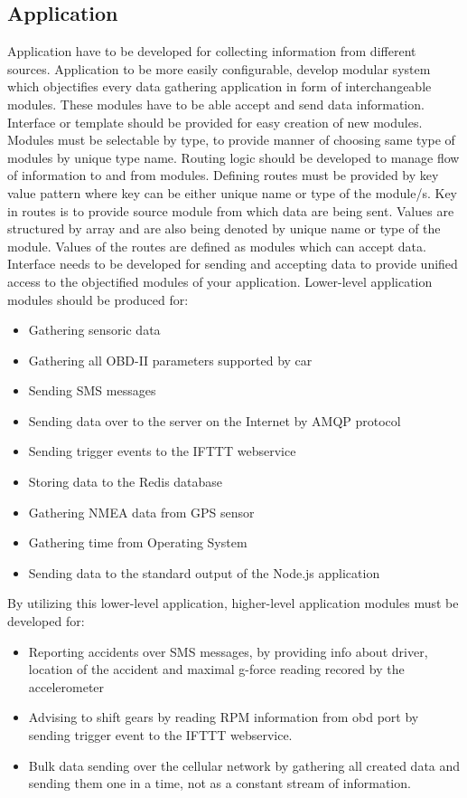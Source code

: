 \subsection{Application}
Application have to be developed for collecting information from different sources. Application to be more easily configurable, develop modular system which objectifies every data gathering application in form of interchangeable modules. These modules have to be able  accept and send data information. Interface or template should be provided for easy creation of new modules. Modules must be selectable by type, to provide manner of choosing same type of modules by unique type name. Routing logic should be developed to manage flow of information to and from modules. Defining routes must be provided by key value pattern where key can be either unique name or type of the module/s. Key in routes is to provide source module from which data are being sent. Values are structured by array and are also being denoted by unique name or type of the module. Values of the routes are defined as modules which can accept data. Interface needs to be developed for sending and accepting data to provide unified access to the objectified modules of your application. Lower-level application modules should be produced for:
\begin{itemize}
 	\item Gathering sensoric data
 	\item Gathering all OBD-II parameters supported by car
 	\item Sending SMS messages
 	\item Sending data over to the server on the Internet by AMQP protocol
 	\item Sending trigger events to the IFTTT webservice
 	\item Storing data to the Redis database
 	\item Gathering NMEA data from GPS sensor
 	\item Gathering time from Operating System
 	\item Sending data to the standard output of the Node.js application
 \end{itemize}
 By utilizing this lower-level application, higher-level application modules must be developed for:
\begin{itemize}
	\item Reporting accidents over SMS messages, by providing info about driver, location of the accident and maximal g-force reading recored by the accelerometer
	\item Advising to shift gears by reading RPM information from \gls{obd} port by sending trigger event to the IFTTT webservice.
	\item Bulk data sending over the cellular network by gathering all created data and sending them one in a time, not as a constant stream of information.
\end{itemize}
